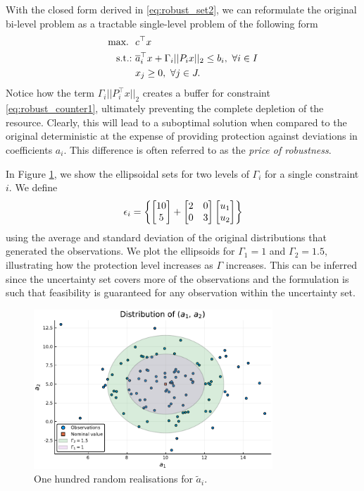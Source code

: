 With the closed form derived in \eqref{eq:robust_set2}, we can reformulate the original bi-level problem as a tractable single-level problem of the following form
%
\begin{align}
	\maxi \ &  c^\top x \nonumber \\
	\st & \overline{a}_i^\top x + \Gamma_i||P_i x||_2 \leq b_i, \ \forall i \in I \label{eq:robust_counter1}\\
	& x_j \geq 0, \ \forall j \in J. \nonumber
\end{align} 
%
Notice how the term $\Gamma_i||P_i^\top x||_2$ creates a buffer for constraint \eqref{eq:robust_counter1}, ultimately preventing the complete depletion of the resource. Clearly, this will lead to a suboptimal solution when compared to the original deterministic at the expense of providing protection against deviations in coefficients $a_i$. This difference is often referred to as the \emph{price of robustness}.

In Figure \ref{fig:ellipsoids}, we show the ellipsoidal sets for two levels of $\Gamma_i$ for a single constraint $i$. We define 
%
\begin{align}
	\epsilon_i = \left\{ \begin{bmatrix} 10 \\ 5 \end{bmatrix} + \begin{bmatrix} 2 & 0 \\ 0 & 3 \end{bmatrix} \begin{bmatrix} u_1 \\ u_2 \end{bmatrix} \right \}
\end{align}
%
using the average and standard deviation of the original distributions that generated the observations. We plot the ellipsoids for $\Gamma_1 = 1$ and $\Gamma_2 = 1.5$, illustrating how the protection level increases as $\Gamma$ increases. This can be inferred since the uncertainty set covers more of the observations and the formulation is such that feasibility is guaranteed for any observation within the uncertainty set. 
%
\begin{figure}
	\includegraphics[width=0.8\textwidth]{figures/part_2_chapter_1/data_with_ellipsoid.pdf}
	\caption{One hundred random realisations for $\tilde{a}_i$.} \label{fig:ellipsoids}
\end{figure}
%


